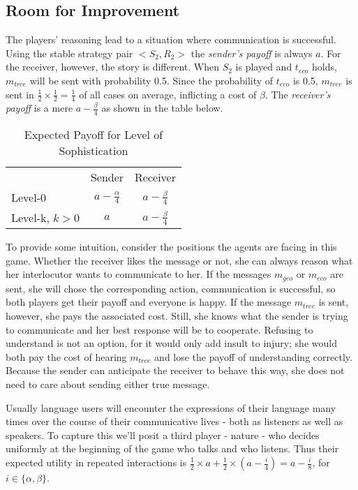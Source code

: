 \documentclass[10pt,a4paper]{article}
\begin{document}
\subsection{Room for Improvement}
The players' reasoning lead to a situation where communication is successful. Using the stable strategy pair $<S_2,R_2>$ the \textit{sender's payoff} is always $a$. For the receiver, however, the story is different. When $S_2$ is played and $t_{eco}$ holds, $m_{tree}$ will be sent with probability 0.5. Since the probability of $t_{eco}$ is 0.5, $m_{tree}$ is sent in $\tfrac{1}{2}\times \tfrac{1}{2} = \tfrac{1}{4}$ of all cases on average, inflicting a cost of $\beta$. The \textit{receiver's payoff} is a mere $a-\tfrac{\beta}{4}$ as shown in the table below.

\begin{table}[h]
\centering
\caption{Expected Payoff for Level of Sophistication}
\begin{tabular}{lcc}
                                    & Sender                                  & Receiver                                \\\cline{2-3}
\multicolumn{1}{l|}{Level-0}        & \multicolumn{1}{c|}{$a-\tfrac{\alpha}{4}$} & \multicolumn{1}{c|}{$a-\tfrac{\beta}{4}$} \\\cline{2-3}
\multicolumn{1}{l|}{Level-k, $k>0$} & \multicolumn{1}{c|}{$a$}                  & \multicolumn{1}{c|}{$a-\tfrac{\beta}{4}$} \\\cline{2-3}
\end{tabular}
\end{table}
To provide some intuition, consider the positions the agents are facing in this game. Whether the receiver likes the message or not, she can always reason what her interlocutor wants to communicate to her. If the messages $m_{geo}$ or $m_{eco}$ are sent, she will chose the corresponding action, communication is successful, so both players get their payoff and everyone is happy. If the message $m_{tree}$ is sent, however, she pays the associated cost. Still, she knows what the sender is trying to communicate and her best response will be to cooperate. Refusing to understand is not an option, for it would only add insult to injury; she would both pay the cost of hearing $m_{tree}$ and lose the payoff of understanding correctly. Because the sender can anticipate the receiver to behave this way, she does not need to care about sending either true message.

Usually language users will encounter the expressions of their language many times over the course of their communicative lives - both as listeners as well as speakers. To capture this we'll posit a third player - nature - who decides uniformly at the beginning of the game who talks and who listens. Thus their expected utility in repeated interactions is $\tfrac{1}{2}\times a + \tfrac{1}{2}\times (a-\tfrac{i}{4})=a-\tfrac{i}{8}$, for $i\in \{\alpha,\beta \}$.
\end{document}
